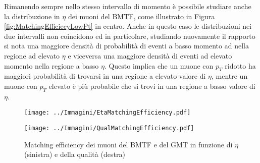 Rimanendo sempre nello stesso intervallo di momento è possibile studiare anche la distribuzione in $\eta$ dei muoni del BMTF, come illustrato in Figura \ref{fig:MatchingEfficiecyLowPt} in centro. Anche in questo caso le distribuzioni nei due intervalli non coincidono ed in particolare, studiando nuovamente il rapporto si nota una maggiore densità di probabilità di eventi a basso momento ad nella regione ad elevato $\eta$ e viceversa una maggiore densità di eventi ad elevato momento nella regione a basso $\eta$. \newline
Questo implica che un muone con $p_T$ ridotto ha maggiori probabilità di trovarsi in una regione a elevato valore di $\eta$, mentre un muone con $p_T$ elevato è più probabile che si trovi in una regione a basso valore di $\eta$.

\begin{figure}[t]
  \centering
  \begin{minipage}[b]{0.49\textwidth}
    \centering
    \texttt{[image: ../Immagini/EtaMatchingEfficiency.pdf]} 
    \end{minipage}
    \hfill 
    \begin{minipage}[b]{0.49\textwidth}
      \centering
      \texttt{[image: ../Immagini/QualMatchingEfficiency.pdf]}
    \end{minipage}
    \caption{Matching efficiency dei muoni del BMTF e del GMT in funzione di $\eta$ (sinistra) e della qualità (destra)}
  \label{fig:MatchingEfficiecyPt3}
\end{figure}


